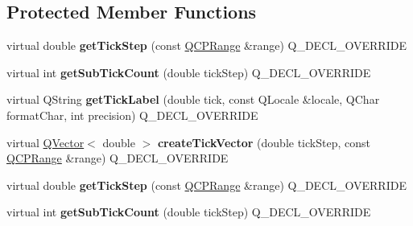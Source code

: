 \subsection*{Protected Member Functions}
\begin{DoxyCompactItemize}
\item 
virtual double {\bfseries get\+Tick\+Step} (const \hyperlink{class_q_c_p_range}{Q\+C\+P\+Range} \&range) Q\+\_\+\+D\+E\+C\+L\+\_\+\+O\+V\+E\+R\+R\+I\+DE\hypertarget{class_q_c_p_axis_ticker_date_time_a0560c14a3f87bb99ab136aca8321b32a}{}\label{class_q_c_p_axis_ticker_date_time_a0560c14a3f87bb99ab136aca8321b32a}

\item 
virtual int {\bfseries get\+Sub\+Tick\+Count} (double tick\+Step) Q\+\_\+\+D\+E\+C\+L\+\_\+\+O\+V\+E\+R\+R\+I\+DE\hypertarget{class_q_c_p_axis_ticker_date_time_a78dece0d51426a3c310528d413e09193}{}\label{class_q_c_p_axis_ticker_date_time_a78dece0d51426a3c310528d413e09193}

\item 
virtual Q\+String {\bfseries get\+Tick\+Label} (double tick, const Q\+Locale \&locale, Q\+Char format\+Char, int precision) Q\+\_\+\+D\+E\+C\+L\+\_\+\+O\+V\+E\+R\+R\+I\+DE\hypertarget{class_q_c_p_axis_ticker_date_time_a4dc6a03f7ea5c619477528a683ed5c18}{}\label{class_q_c_p_axis_ticker_date_time_a4dc6a03f7ea5c619477528a683ed5c18}

\item 
virtual \hyperlink{class_q_vector}{Q\+Vector}$<$ double $>$ {\bfseries create\+Tick\+Vector} (double tick\+Step, const \hyperlink{class_q_c_p_range}{Q\+C\+P\+Range} \&range) Q\+\_\+\+D\+E\+C\+L\+\_\+\+O\+V\+E\+R\+R\+I\+DE\hypertarget{class_q_c_p_axis_ticker_date_time_a44c2c09a303d281801b69226e243047d}{}\label{class_q_c_p_axis_ticker_date_time_a44c2c09a303d281801b69226e243047d}

\item 
virtual double {\bfseries get\+Tick\+Step} (const \hyperlink{class_q_c_p_range}{Q\+C\+P\+Range} \&range) Q\+\_\+\+D\+E\+C\+L\+\_\+\+O\+V\+E\+R\+R\+I\+DE\hypertarget{class_q_c_p_axis_ticker_date_time_ab6f6570d12c875dd3c57d71d399fff0b}{}\label{class_q_c_p_axis_ticker_date_time_ab6f6570d12c875dd3c57d71d399fff0b}

\item 
virtual int {\bfseries get\+Sub\+Tick\+Count} (double tick\+Step) Q\+\_\+\+D\+E\+C\+L\+\_\+\+O\+V\+E\+R\+R\+I\+DE\hypertarget{class_q_c_p_axis_ticker_date_time_a0bd73692b3e7636e9fe6e00645dfc4ed}{}\label{class_q_c_p_axis_ticker_date_time_a0bd73692b3e7636e9fe6e00645dfc4ed}


\end{DoxyCompactItemize}
